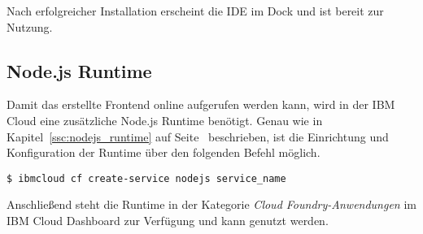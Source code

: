 Nach erfolgreicher Installation erscheint die IDE im Dock und ist bereit zur Nutzung.

\subsection{Node.js Runtime}
Damit das erstellte Frontend online aufgerufen werden kann, wird in der IBM Cloud eine zusätzliche Node.js Runtime
benötigt. Genau wie in Kapitel~\ref{ssc:nodejs_runtime} auf Seite~\pageref{ssc:nodejs_runtime} beschrieben, ist die
Einrichtung und Konfiguration der Runtime über den folgenden Befehl möglich.

\begin{lstlisting}[caption=Instanziierung der Node.js Runtime, label=ls:vorbereitung_nodejsdashboard]
    $ ibmcloud cf create-service nodejs service_name
\end{lstlisting}

Anschließend steht die Runtime in der Kategorie \textit{Cloud Foundry-Anwendungen} im IBM Cloud Dashboard zur Verfügung
und kann genutzt werden.